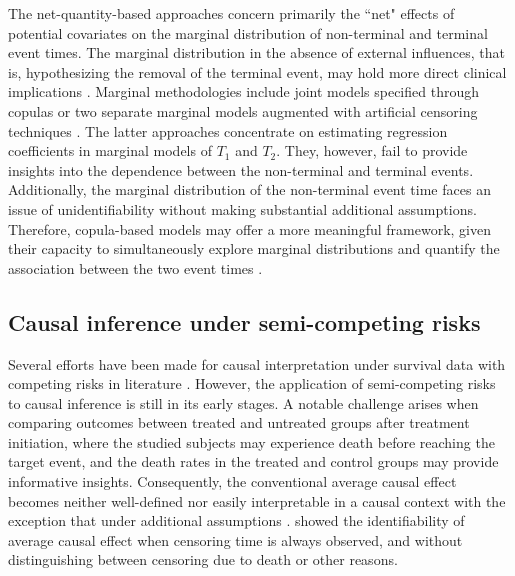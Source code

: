 \documentclass[aoas]{imsart}
\theoremstyle{plain}
\begin{document}
The net-quantity-based approaches concern primarily the ``net" effects of potential covariates on the marginal distribution of non-terminal and terminal event times. The marginal distribution in the absence of external influences, that is, hypothesizing the removal of the terminal event, may hold more direct clinical implications \citep{varadhan2014semicompeting}. Marginal methodologies include joint models specified through copulas \citep{peng2007semicompeting,chen2012semicompeting,peng2018semicompeting} or two separate marginal models augmented with artificial censoring techniques \citep{peng2006artificial,Ding2009artificial}. 
The latter approaches concentrate on estimating regression coefficients in marginal models of $T_1$ and $T_2$.
They, however, fail to provide insights into the dependence between the non-terminal and terminal events. 
Additionally, the marginal distribution of the non-terminal event time faces an issue of unidentifiability without making substantial additional assumptions.  
Therefore, copula-based models may offer a more meaningful framework, given their capacity to simultaneously explore marginal distributions and quantify the association between the two event times \citep{emura2021conditional,sun2023penalised,wei2023bivariate,yu2023unified}.

\subsection{Causal inference under semi-competing risks}

Several efforts have been made for causal interpretation under survival data with competing risks in literature \citep{young2020,stensrud2021generalized,stensrud2022}. %
However, the application of semi-competing risks to causal inference is still in its early stages. A notable challenge arises when comparing outcomes between treated and untreated groups after treatment initiation, where the studied subjects may experience death before reaching the target event, and the death rates in the treated and control groups may provide informative insights. Consequently, the conventional average causal effect becomes neither well-defined nor easily interpretable in a causal context with the exception that under additional assumptions  \citep{Nevo2022semicompeting, axelrod2022sensitivity}. \cite{robins1995analytic} showed the identifiability of average causal effect when censoring time is always observed, and without distinguishing between censoring due to death or other reasons. 
\end{document}
